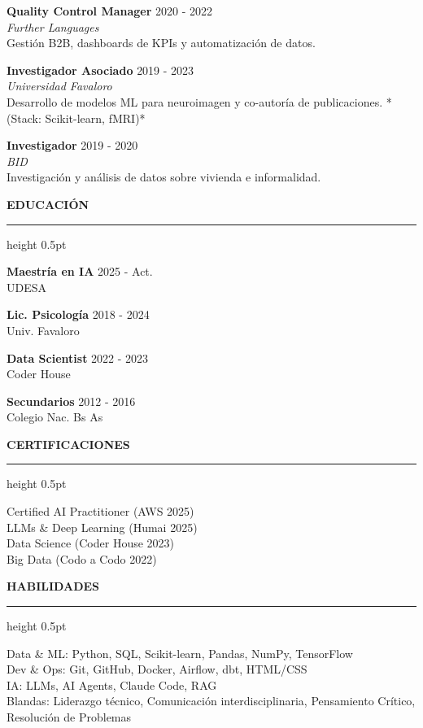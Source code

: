 \documentclass[11pt,a4paper]{article}
\newcommand{\cvtitle}[1]{ %
  {\color{primary}\bfseries\large\uppercase{ #1 }}
  {\color{accent}\hrule height 0.5pt}\vspace{6pt}
}
\newcommand{\cvexperience}[4]{ %
  {\bfseries\normalsize\color{primary} #1 } \hfill {\small\color{gray} #3 }\\
  {\small\color{accent}\itshape #2 } \\
  {\small #4 }\par
  \vspace{5pt}
}
\newcommand{\cveducation}[3]{ %
  {\bfseries\small\color{primary} #1 } \hfill {\small\color{gray} #3 }\\
  {\small #2 }\par
}
\begin{document}
\cvexperience{Quality Control Manager}{Further Languages}{2020 - 2022}{Gestión B2B, dashboards de KPIs y automatización de datos.}

\cvexperience{Investigador Asociado}{Universidad Favaloro}{2019 - 2023}{Desarrollo de modelos ML para neuroimagen y co-autoría de publicaciones. *(Stack: Scikit-learn, fMRI)*}

\cvexperience{Investigador}{BID}{2019 - 2020}{Investigación y análisis de datos sobre vivienda e informalidad.}



\begin{minipage}[t]{0.48\textwidth}
\cvtitle{ Educación }

\cveducation{Maestría en IA}{UDESA}{2025 - Act.}

\cveducation{Lic. Psicología}{Univ. Favaloro}{2018 - 2024}

\cveducation{Data Scientist}{Coder House}{2022 - 2023}

\cveducation{Secundarios}{Colegio Nac. Bs As}{2012 - 2016}

\end{minipage}
\hfill
\begin{minipage}[t]{0.48\textwidth}
\cvtitle{ Certificaciones }
{\normalsize

Certified AI Practitioner (AWS 2025) \\

LLMs \& Deep Learning (Humai 2025) \\

Data Science (Coder House 2023) \\

Big Data (Codo a Codo 2022) \\

}
\end{minipage}

\vspace{8pt}

\cvtitle{ Habilidades }
{\normalsize

Data & ML: Python, SQL, Scikit-learn, Pandas, NumPy, TensorFlow \\

Dev & Ops: Git, GitHub, Docker, Airflow, dbt, HTML/CSS \\

IA: LLMs, AI Agents, Claude Code, RAG \\

Blandas: Liderazgo técnico, Comunicación interdisciplinaria, Pensamiento Crítico, Resolución de Problemas \\

}
\end{document}
